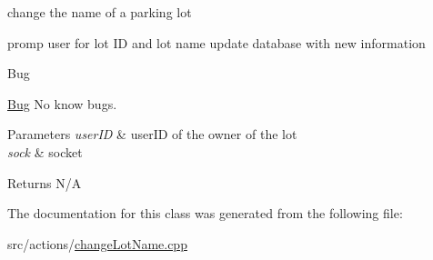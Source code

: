change the name of a parking lot 

promp user for lot ID and lot name update database with new information

\begin{DoxyRefDesc}{Bug}
\item[\mbox{\hyperlink{bug__bug000004}{Bug}}]No know bugs. \end{DoxyRefDesc}

\begin{DoxyParams}{Parameters}
{\em user\+ID} & user\+ID of the owner of the lot \\
\hline
{\em sock} & socket \\
\hline
\end{DoxyParams}
\begin{DoxyReturn}{Returns}
N/A 
\end{DoxyReturn}


The documentation for this class was generated from the following file\+:\begin{DoxyCompactItemize}
\item 
src/actions/\mbox{\hyperlink{change_lot_name_8cpp}{change\+Lot\+Name.\+cpp}}\end{DoxyCompactItemize}
